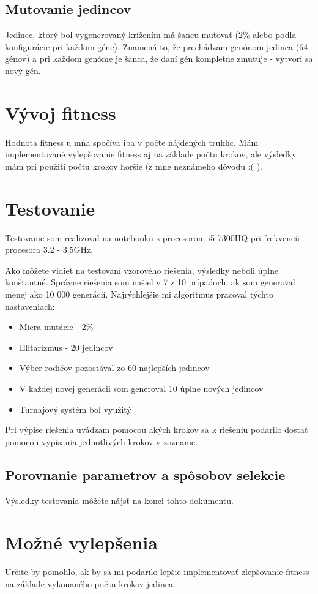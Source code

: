 \documentclass[10pt,oneside,slovak,a4paper]{article}
\begin{document}
\subsection{Mutovanie jedincov}

Jedinec, ktorý bol vygenerovaný krížením má šancu mutovať (2\% alebo podľa konfigurácie pri každom géne).
Znamená to, že prechádzam genónom jedinca (64 génov) a pri každom genóme je šanca, že daní gén kompletne zmutuje - vytvorí sa nový gén.



\section{Vývoj fitness}

Hodnota fitness u mňa spočíva iba v počte nájdených truhlíc. Mám implementované vylepšovanie fitness aj na základe počtu krokov, ale výsledky mám pri použití počtu krokov horšie (z mne neznámeho dôvodu :( ).



\section{Testovanie}
Testovanie som realizoval na notebooku s procesorom i5-7300HQ pri frekvencii procesora 3.2 - 3.5GHz.


\medskip

Ako môžete vidieť na testovaní vzorového riešenia, výsledky neboli úplne konštantné.
Správne riešenia som našiel v 7 z 10 prípadoch, ak som generoval menej ako 10 000 generácií.
Najrýchlejšie mi algoritmus pracoval týchto nastaveniach:

\begin{itemize}
\item{Miera mutácie - 2\%}
\item{Elitarizmus - 20 jedincov}
\item{Výber rodičov pozostával zo 60 najlepších jedincov}
\item{V každej novej generácii som generoval 10 úplne nových jedincov}
\item{Turnajový systém bol využitý}
\end{itemize}

\medskip 

Pri výpise riešenia uvádzam pomocou akých krokov sa k riešeniu podarilo dostať pomocou vypísania jednotlivých krokov v zozname.

\subsection{Porovnanie parametrov a spôsobov selekcie}

Výsledky testovania môžete nájsť na konci tohto dokumentu.  

\section{Možné vylepšenia}
Určite by pomohlo, ak by sa mi podarilo lepšie implementovať zlepšovanie fitness na základe vykonaného počtu krokov jedinca. 
\end{document}
